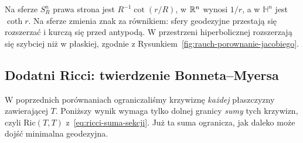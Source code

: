 Na sferze $S_R^n$ prawa strona jest
$R^{-1}\cot(r/R)$, w $\mathbb{R}^n$ wynosi $1/r$,
a w $\mathbb H^n$ jest $\coth r$.
Na sferze zmienia znak za równikiem:
sfery geodezyjne przestają się rozszerzać
i kurczą się przed antypodą. W przestrzeni
hiperbolicznej rozszerzają się szybciej niż
w płaskiej, zgodnie z Rysunkiem~\ref{fig:rauch-porownanie-jacobiego}.

\subsection*{Dodatni Ricci: twierdzenie Bonneta--Myersa}

W poprzednich porównaniach ograniczaliśmy
krzywiznę \emph{każdej} płaszczyzny zawierającej
$T$. Poniższy wynik wymaga tylko dolnej granicy
\emph{sumy} tych krzywizn, czyli $\mathrm{Ric}(T,T)$
z~\eqref{eq:ricci-suma-sekcji}. Już ta suma
ogranicza, jak daleko może dojść minimalna
geodezyjna.

